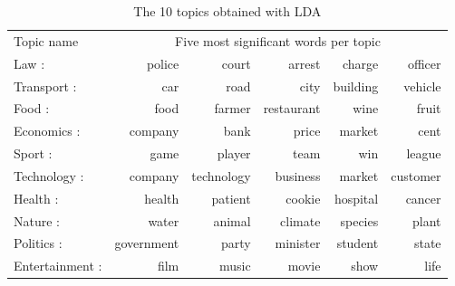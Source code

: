 
\begin{table}[htbp!]

\centering%
\caption{The 10 topics obtained with LDA}
\label{tab:topics}


\begin{tabular}{@{}lrrrrr@{}}
\toprule
\multicolumn{1}{l}{Topic name} & \multicolumn{5}{c}{Five most significant words per topic} \\
\cmidrule(r){1-1}\cmidrule(l){2-6}
Law : & police & court & arrest & charge & officer \\
Transport : & car & road & city & building & vehicle \\
Food : & food & farmer & restaurant & wine & fruit \\
Economics : & company & bank & price & market & cent \\
Sport : & game & player & team & win & league \\
Technology : & company & technology & business & market & customer \\
Health : & health & patient & cookie & hospital & cancer \\
Nature : & water & animal & climate & species & plant \\
Politics : & government & party & minister & student & state \\
Entertainment : & film & music & movie & show & life \\ \bottomrule
\end{tabular}


\end{table}